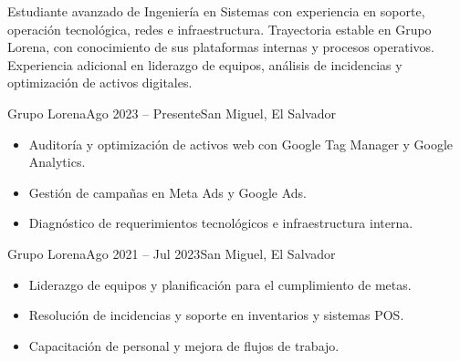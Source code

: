 \documentclass[10pt,a4paper,ragged2e]{Mark_IV_Plantilla}
\begin{document}


\begin{fullwidth}
\makecvheader


Estudiante avanzado de Ingeniería en Sistemas con experiencia en soporte,
operación tecnológica, redes e infraestructura. Trayectoria estable en Grupo
Lorena, con conocimiento de sus plataformas internas y procesos operativos.
Experiencia adicional en liderazgo de equipos, análisis de incidencias y
optimización de activos digitales.
\end{fullwidth}


\marginpar{\vspace*{\dimexpr1pt-\baselineskip}\raggedright\markivsidebar}


{Grupo Lorena}{Ago 2023 -- Presente}{San Miguel, El Salvador}
\begin{itemize}
  \item Auditoría y optimización de activos web con Google Tag Manager y
  Google Analytics.
  \item Gestión de campañas en Meta Ads y Google Ads.
  \item Diagnóstico de requerimientos tecnológicos e infraestructura interna.
\end{itemize}
\divider

{Grupo Lorena}{Ago 2021 -- Jul 2023}{San Miguel, El Salvador}
\begin{itemize}
  \item Liderazgo de equipos y planificación para el cumplimiento de metas.
  \item Resolución de incidencias y soporte en inventarios y sistemas POS.
  \item Capacitación de personal y mejora de flujos de trabajo.
\end{itemize}
\divider
\end{document}
